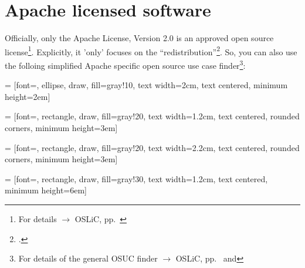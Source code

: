 %
%
%
%
%



\section{Apache licensed software}

Officially, only the Apache License, Version 2.0 is an approved open source
license\footnote{For details $\rightarrow$ OSLiC, pp.\
\pageref{sec:ProtectPowerOfApL}}.
Explicitly, it 'only' focuses on the
\enquote{redistribution}\footcite[cf.][\nopage wp. §4]{OSI2012b}. So, you can
also use the folloing simplified Apache specific open source use case
finder\footnote{For details of the general OSUC finder $\rightarrow$ OSLiC, pp.\
\pageref{OsucTokens} and \pageref{OsucDefinitionTree}}:
 
 = [font=\small, ellipse, draw, fill=gray!10, 
    text width=2cm, text centered, minimum height=2em]

 = [font=\footnotesize, rectangle, draw, fill=gray!20, 
    text width=1.2cm, text centered, rounded corners, minimum height=3em]

\tikzstyle{nodb} = [font=\footnotesize, rectangle, draw, fill=gray!20, 
    text width=2.2cm, text centered, rounded corners, minimum height=3em]
    
\tikzstyle{leaf} = [font=\tiny, rectangle, draw, fill=gray!30, 
    text width=1.2cm, text centered, minimum height=6em]

